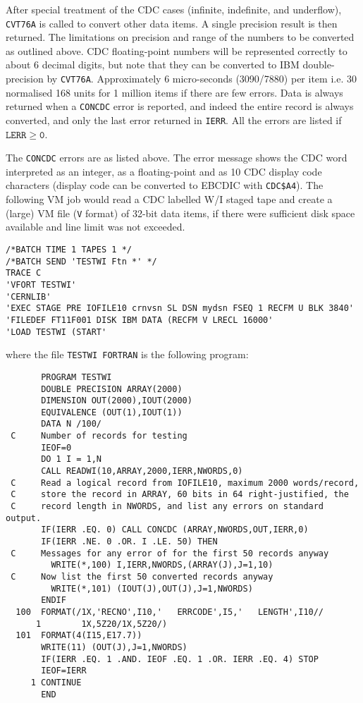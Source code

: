 \par
After special treatment of the CDC cases (infinite, indefinite, and
underflow), {\tt CVT76A} is called to convert other data items. A single
precision result is then returned.
\Restrict
The limitations on precision and range of the numbers to be converted as
outlined above.
\Accuracy
CDC floating-point numbers will be represented correctly to about 6
decimal digits, but note that they can be converted to IBM
double-precision by {\tt CVT76A}.
\Timing
Approximately 6 micro-seconds (3090/7880) per item i.e. 30
normalised 168 units for 1 million items if there are few errors.
\Errorh
Data is always returned when a {\tt CONCDC} error is reported, and
indeed the entire record is always converted, and only the last error
returned in {\tt IERR}. All the errors are listed if $\mathtt{LERR \geq 0}$.
\par
The {\tt CONCDC} errors are as listed above. The error message shows the
CDC word interpreted as an integer, as a floating-point and as 10 CDC
display code characters (display code can be converted to EBCDIC with
{\tt CDC\$A4}).
\Examples
The following VM job would read a CDC labelled W/I staged tape and
create a (large) VM file ({\tt V} format) of 32-bit data items, if there
were sufficient disk space available and line limit was not exceeded.
\begin{verbatim}
/*BATCH TIME 1 TAPES 1 */
/*BATCH SEND 'TESTWI Ftn *' */
TRACE C
'VFORT TESTWI'
'CERNLIB'
'EXEC STAGE PRE IOFILE10 crnvsn SL DSN mydsn FSEQ 1 RECFM U BLK 3840'
'FILEDEF FT11F001 DISK IBM DATA (RECFM V LRECL 16000'
'LOAD TESTWI (START'
\end{verbatim}
where the file {\tt TESTWI FORTRAN} is the following program:
\begin{verbatim}
       PROGRAM TESTWI
       DOUBLE PRECISION ARRAY(2000)
       DIMENSION OUT(2000),IOUT(2000)
       EQUIVALENCE (OUT(1),IOUT(1))
       DATA N /100/
 C     Number of records for testing
       IEOF=0
       DO 1 I = 1,N
       CALL READWI(10,ARRAY,2000,IERR,NWORDS,0)
 C     Read a logical record from IOFILE10, maximum 2000 words/record,
 C     store the record in ARRAY, 60 bits in 64 right-justified, the
 C     record length in NWORDS, and list any errors on standard output.
       IF(IERR .EQ. 0) CALL CONCDC (ARRAY,NWORDS,OUT,IERR,0)
       IF(IERR .NE. 0 .OR. I .LE. 50) THEN
 C     Messages for any error of for the first 50 records anyway
         WRITE(*,100) I,IERR,NWORDS,(ARRAY(J),J=1,10)
 C     Now list the first 50 converted records anyway
         WRITE(*,101) (IOUT(J),OUT(J),J=1,NWORDS)
       ENDIF
  100  FORMAT(/1X,'RECNO',I10,'   ERRCODE',I5,'   LENGTH',I10//
      1        1X,5Z20/1X,5Z20/)
  101  FORMAT(4(I15,E17.7))
       WRITE(11) (OUT(J),J=1,NWORDS)
       IF(IERR .EQ. 1 .AND. IEOF .EQ. 1 .OR. IERR .EQ. 4) STOP
       IEOF=IERR
     1 CONTINUE
       END
\end{verbatim}
